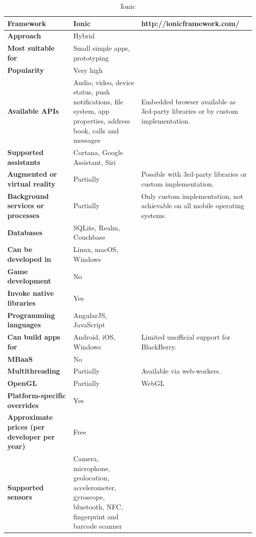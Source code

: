 \documentclass[english,master,public,dept460,male,cpdeclaration,oneside]{diploma}
\begin{document}
\begin{table}[!h]
	\centering
	\caption{Ionic}
	\begin{tabular}{p{} | p{} | p{}}
		\toprule		
		\textbf{Framework} & \textbf{Ionic} & http://ionicframework.com/ \\
		\midrule
		\textbf{Approach} & Hybrid & \\			
		\midrule	
		\textbf{Most suitable for} & Small simple apps, prototyping & \\
		\midrule
		\textbf{Popularity} & Very high & \\			
		\midrule
		\textbf{Available APIs} & Audio, video, device status, push notifications, file system, app properties, address book, calls and messages & Embedded browser available as 3rd-party libraries or by custom implementation. \\			
		\midrule
		\textbf{Supported assistants} & Cortana, Google Assistant, Siri & \\			
		\midrule
		\textbf{Augmented or virtual reality} & Partially & Possible with 3rd-party libraries or custom implementation. \\			
		\midrule
		\textbf{Background services or processes} & Partially & Only custom implementation, not achievable on all mobile operating systems. \\			
		\midrule
		\textbf{Databases} & SQLite, Realm, Couchbase & \\			
		\midrule
		\textbf{Can be developed in} & Linux, macOS, Windows &  \\			
		\midrule
		\textbf{Game development} & No & \\			
		\midrule
		\textbf{Invoke native libraries} & Yes & \\			
		\midrule
		\textbf{Programming languages} & AngularJS, JavaScript & \\			
		\midrule
		\textbf{Can build apps for} & Android, iOS, Windows & Limited unofficial support for BlackBerry. \\			
		\midrule
		\textbf{MBaaS} & No & \\			
		\midrule
		\textbf{Multithreading} & Partially & Available via web-workers. \\			
		\midrule
		\textbf{OpenGL} & Partially & WebGL \\			
		\midrule
		\textbf{Platform-specific overrides} & Yes & \\			
		\midrule
		\textbf{Approximate prices (per developer per year)} & Free & \\			
		\midrule
		\textbf{Supported sensors} & Camera, microphone, geolocation, accelerometer, gyroscope, bluetooth, NFC, fingerprint and barcode scanner & \\			
		\midrule
	\end{tabular}
\end{table}
\end{document}
